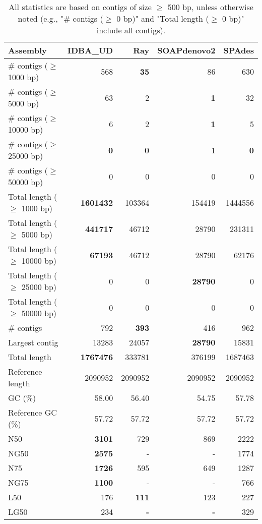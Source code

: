 \documentclass[12pt,a4paper]{article}
\begin{document}
\begin{table}[ht]
\begin{center}
\caption{All statistics are based on contigs of size $\geq$ 500 bp, unless otherwise noted (e.g., "\# contigs ($\geq$ 0 bp)" and "Total length ($\geq$ 0 bp)" include all contigs).}
\begin{tabular}{|l*{4}{|r}|}
\hline
Assembly & IDBA\_UD & Ray & SOAPdenovo2 & SPAdes \\ \hline
\# contigs ($\geq$ 1000 bp) & 568 & {\bf 35} & 86 & 630 \\ \hline
\# contigs ($\geq$ 5000 bp) & 63 & 2 & {\bf 1} & 32 \\ \hline
\# contigs ($\geq$ 10000 bp) & 6 & 2 & {\bf 1} & 5 \\ \hline
\# contigs ($\geq$ 25000 bp) & {\bf 0} & {\bf 0} & 1 & {\bf 0} \\ \hline
\# contigs ($\geq$ 50000 bp) & 0 & 0 & 0 & 0 \\ \hline
Total length ($\geq$ 1000 bp) & {\bf 1601432} & 103364 & 154419 & 1444556 \\ \hline
Total length ($\geq$ 5000 bp) & {\bf 441717} & 46712 & 28790 & 231311 \\ \hline
Total length ($\geq$ 10000 bp) & {\bf 67193} & 46712 & 28790 & 62176 \\ \hline
Total length ($\geq$ 25000 bp) & 0 & 0 & {\bf 28790} & 0 \\ \hline
Total length ($\geq$ 50000 bp) & 0 & 0 & 0 & 0 \\ \hline
\# contigs & 792 & {\bf 393} & 416 & 962 \\ \hline
Largest contig & 13283 & 24057 & {\bf 28790} & 15831 \\ \hline
Total length & {\bf 1767476} & 333781 & 376199 & 1687463 \\ \hline
Reference length & 2090952 & 2090952 & 2090952 & 2090952 \\ \hline
GC (\%) & 58.00 & 56.40 & 54.75 & 57.78 \\ \hline
Reference GC (\%) & 57.72 & 57.72 & 57.72 & 57.72 \\ \hline
N50 & {\bf 3101} & 729 & 869 & 2222 \\ \hline
NG50 & {\bf 2575} & - & - & 1774 \\ \hline
N75 & {\bf 1726} & 595 & 649 & 1287 \\ \hline
NG75 & {\bf 1100} & - & - & 766 \\ \hline
L50 & 176 & {\bf 111} & 123 & 227 \\ \hline
LG50 & 234 & {\bf -} & {\bf -} & 329 \\ \hline

\end{tabular}
\end{center}
\end{table}
\end{document}
